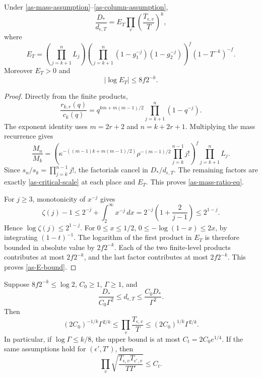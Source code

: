 \begin{proposition}\label{as-mass-ratio}
Under \eqref{as-mass-assumption}--\eqref{as-column-assumption},
\begin{equation}\label{as-mass-ratio-eq}
 \frac{D_*}{d_{\epsilon,T}}
   =E_T\prod_v\left(\frac{T_{\epsilon,v}}T\right)^k,
\end{equation}
where
\[
 E_T=\left(\prod_{j=k+1}^nL_j\right)
       \left(\prod_{j=k+1}^n
                    (1-g_1^{-j})(1-g_2^{-j})\right)^f
                         (1-T^{-k})^{-f}.
\]
Moreover $E_T>0$ and
\begin{equation}\label{as-E-bound}
 |\log E_T|\leq8f2^{-k}.
\end{equation}
\end{proposition}

\begin{proof}
Directly from the finite products,
\[
 \frac{r_{k,r}(q)}{c_k(q)}
   =q^{km+m(m-1)/2}\prod_{j=k+1}^n(1-q^{-j}).
\]
The exponent identity uses $m=2r+2$ and $n=k+2r+1$.
Multiplying the mass recurrence gives
\[
 \frac{M_n}{M_k}
   =\left(\kappa^{-((m-1)k+m(m-1)/2)}
             \rho^{-(m-1)/2}\prod_{j=k}^{n-1}j!\right)^f
                   \prod_{j=k+1}^nL_j.
\]
Since $s_n/s_k=\prod_{j=k}^{n-1}j!$, the factorials cancel
in $D_*/d_{\epsilon,T}$.  The remaining factors are exactly
\eqref{as-critical-scale} at each place and $E_T$.
This proves \eqref{as-mass-ratio-eq}.

For $j\geq3$, monotonicity of $x^{-j}$ gives
\[
 \zeta(j)-1\leq2^{-j}+\int_2^\infty x^{-j}\,dx
       =2^{-j}\left(1+\frac2{j-1}\right)\leq2^{1-j}.
\]
Hence $\log\zeta(j)\leq2^{1-j}$.
For $0\leq x\leq1/2$,
$0\leq-\log(1-x)\leq2x$, by integrating $(1-t)^{-1}$.
The logarithm of the first product in $E_T$ is therefore
bounded in absolute value by $2f2^{-k}$.
Each of the two finite-level products contributes at most
$2f2^{-k}$, and the last factor contributes at most
$2f2^{-k}$.  This proves \eqref{as-E-bound}.
\end{proof}

\begin{corollary}\label{as-product-critical}
Suppose $8f2^{-k}\leq\log2$, $C_0\geq1$, $\Gamma\geq1$, and
\begin{equation}\label{as-choice-dimension}
 \frac{D_*}{C_0\Gamma^2}\leq d_{\epsilon,T}
                      \leq\frac{C_0D_*}{\Gamma^2}.
\end{equation}
Then
\[
 (2C_0)^{-1/k}\Gamma^{2/k}
  \leq\prod_v\frac{T_{\epsilon,v}}T
  \leq(2C_0)^{1/k}\Gamma^{2/k}.
\]
In particular, if $\log\Gamma\leq k/8$, the upper bound
is at most $C_t=2C_0e^{1/4}$.
If the same assumptions hold for $(\epsilon',T')$, then
\begin{equation}\label{as-product-t}
 \prod_v\sqrt{\frac{T_{\epsilon,v}T_{\epsilon',v}}{TT'}}
                              \leq C_t.
\end{equation}
\end{corollary}

